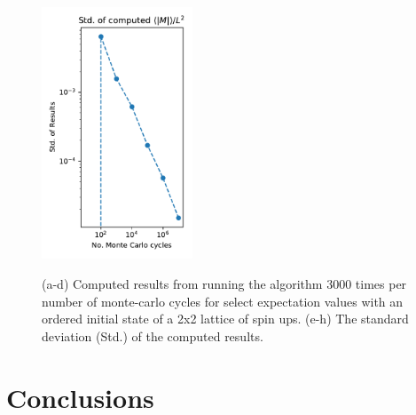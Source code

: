 \documentclass[10pt,showpacs,preprintnumbers,amsmath,amssymb,nofootinbib,aps,prl,twocolumn,groupedaddress,superscriptaddress,showkeys]{revtex4-1}
\begin{document}
\begin{figure}[h!t]
{      \includegraphics[width=4.5cm]{figs/exb_convergencetest_M_abs_std.pdf}
      }
    \caption{\label{fig:convergence 2x2} 
      (a-d) Computed results from running the algorithm 3000 times per number of monte-carlo cycles for 
      select expectation values with an ordered initial state of a 2x2 lattice of spin ups. (e-h) The standard deviation (Std.) of the computed results.
    }
  \end{figure}



\section{Conclusions}


\end{document}
